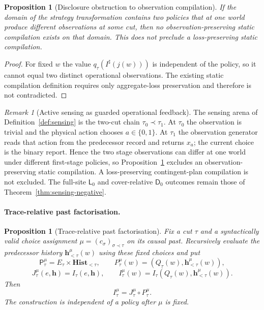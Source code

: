 \documentclass[11pt]{article}
\theoremstyle{plain}
\newtheorem{proposition}[theorem]{Proposition}
\theoremstyle{definition}
\theoremstyle{remark}
\newtheorem{remark}[theorem]{Remark}
\begin{document}
\begin{proposition}[Disclosure obstruction to observation compilation]
\label{prop:observation-compilation-no-go}
If the domain of the strategy transformation contains two policies that at one
world produce different observations at some cut, then no observation-preserving
static compilation exists on that domain. This does not preclude a
loss-preserving static compilation.
\end{proposition}

\begin{proof}
For fixed $w$ the value $q_\tau(I^\sharp(j(w)))$ is independent of the policy,
so it cannot equal two distinct operational observations. The existing static
compilation definition requires only aggregate-loss preservation and therefore
is not contradicted.
\end{proof}


\begin{remark}[Active sensing as guarded operational feedback]
\label{rem:sensing-operational}
The sensing arena of Definition~\ref{def:sensing} is the two-cut chain
$\tau_0\prec\tau_1$. At $\tau_0$ the observation is trivial and the physical
action chooses $a\in\{0,1\}$. At $\tau_1$ the observation generator reads that
action from the predecessor record and returns $x_a$; the current choice is the
binary report. Hence the two stage observations can differ at one world under
different first-stage policies, so
Proposition~\ref{prop:observation-compilation-no-go} excludes an
observation-preserving static compilation. A loss-preserving contingent-plan
compilation is not excluded. The full-site $\mathsf L_0$ and cover-relative
$\mathsf D_0$ outcomes remain those of
Theorem~\ref{thm:sensing-negative}.
\end{remark}

\paragraph{Trace-relative past factorisation.}

\begin{proposition}[Trace-relative past factorisation]
\label{prop:trace-relative-past}
Fix a cut $\tau$ and a syntactically valid choice assignment
$\mu=(c_\sigma)_{\sigma\prec\tau}$ on its causal past. Recursively evaluate the
predecessor history $\mathbf h_{<\tau}^\mu(w)$ using these fixed choices and
put
\[
\mathsf P_\tau^\mu=E_\tau\times\mathbf{Hist}_{<\tau},
\qquad
P_\tau^\mu(w)=(Q_\tau(w),\mathbf h_{<\tau}^\mu(w)),
\]
\[
J_\tau^\mu(e,\mathbf h)=I_\tau(e,\mathbf h),
\qquad
I_\tau^\mu(w)=I_\tau(Q_\tau(w),\mathbf h_{<\tau}^\mu(w)).
\]
Then
\[
I_\tau^\mu=J_\tau^\mu\circ P_\tau^\mu.
\]
The construction is independent of a policy after $\mu$ is fixed.
\end{proposition}
\end{document}
